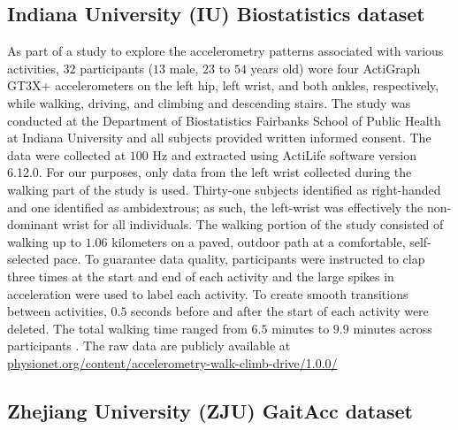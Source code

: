 \subsection{Indiana University (IU) Biostatistics dataset}\label{subsec:IUB}
As part of a study to explore the accelerometry patterns associated with various activities, $32$ participants ($13$ male, $23$ to $54$ years old) wore four ActiGraph GT3X+ accelerometers on the left hip, left wrist, and both ankles, respectively, while walking, driving, and climbing and descending stairs. The study was conducted at the Department of Biostatistics Fairbanks School of Public Health at Indiana University and all subjects provided written informed consent. The data were collected at $100$ Hz and extracted using ActiLife software version 6.12.0. For our purposes, only data from the left wrist collected during the walking part of the study is used. Thirty-one subjects identified as right-handed and one identified as ambidextrous; as such, the left-wrist was effectively the non-dominant wrist for all individuals. 
The walking portion of the study consisted  of walking up to $1.06$ kilometers on a paved, outdoor path at a comfortable, self-selected pace. To guarantee data quality, participants were instructed to clap three times at the start and end of each activity and the large spikes in acceleration were used to label each activity. To create smooth transitions between activities, $0.5$ seconds before and after the start of each activity were deleted. The total walking time ranged from $6.5$ minutes to $9.9$ minutes across participants \cite{fadel_differentiating_2019}.  The raw data are publicly available at \url{physionet.org/content/accelerometry-walk-climb-drive/1.0.0/}
\subsection{Zhejiang University (ZJU) GaitAcc dataset}


